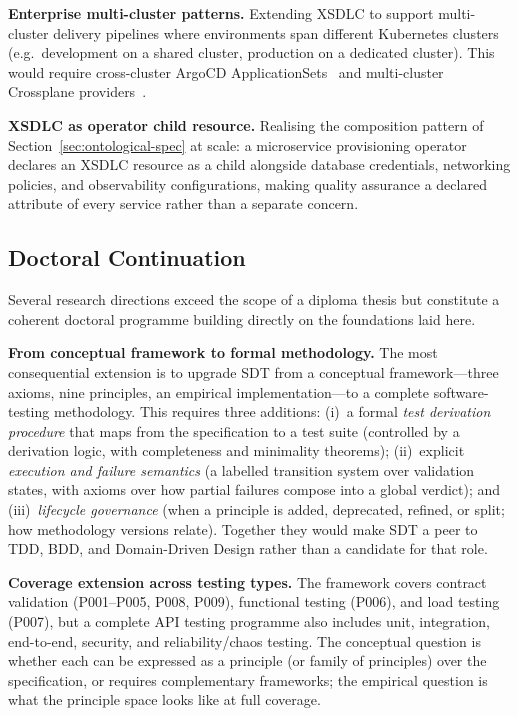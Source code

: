 \textbf{Enterprise multi-cluster patterns.} Extending XSDLC to support multi-cluster delivery pipelines where environments span different Kubernetes clusters (e.g.\ development on a shared cluster, production on a dedicated cluster). This would require cross-cluster ArgoCD ApplicationSets~\cite{argocd} and multi-cluster Crossplane providers~\cite{crossplane}.

\textbf{XSDLC as operator child resource.} Realising the composition pattern of Section~\ref{sec:ontological-spec} at scale: a microservice provisioning operator declares an XSDLC resource as a child alongside database credentials, networking policies, and observability configurations, making quality assurance a declared attribute of every service rather than a separate concern.

\subsection{Doctoral Continuation}
\label{subsec:doctoral-continuation}

Several research directions exceed the scope of a diploma thesis but constitute a coherent doctoral programme building directly on the foundations laid here.

\textbf{From conceptual framework to formal methodology.} The most consequential extension is to upgrade SDT from a conceptual framework---three axioms, nine principles, an empirical implementation---to a complete software-testing methodology. This requires three additions: (i)~a formal \emph{test derivation procedure} that maps from the specification to a test suite (controlled by a derivation logic, with completeness and minimality theorems); (ii)~explicit \emph{execution and failure semantics} (a labelled transition system over validation states, with axioms over how partial failures compose into a global verdict); and (iii)~\emph{lifecycle governance} (when a principle is added, deprecated, refined, or split; how methodology versions relate). Together they would make SDT a peer to TDD, BDD, and Domain-Driven Design rather than a candidate for that role.

\textbf{Coverage extension across testing types.} The framework covers contract validation (P001--P005, P008, P009), functional testing (P006), and load testing (P007), but a complete API testing programme also includes unit, integration, end-to-end, security, and reliability/chaos testing. The conceptual question is whether each can be expressed as a principle (or family of principles) over the specification, or requires complementary frameworks; the empirical question is what the principle space looks like at full coverage.

